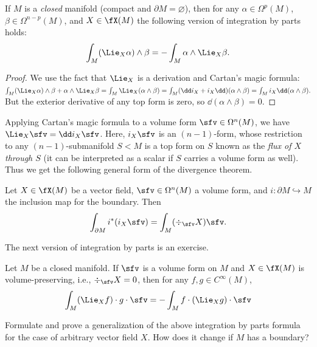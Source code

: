 \begin{cor}
    If $M$ is a \emph{closed} manifold (compact and $\partial M=\varnothing$), then for any $\alpha\in\Omega^p(M)$, $\beta\in\Omega^{n-p}(M)$, and $X\in\fX(M)$ the following version of integration by parts holds:
    \[\int_M (\Lie_X \alpha)\wedge\beta=-\int_M \alpha\wedge\Lie_X\beta.\]
\end{cor}
\begin{proof}
    We use the fact that $\Lie_X$ is a derivation and Cartan's magic formula:
    $\int_M (\Lie_X\alpha)\wedge\beta+\alpha\wedge\Lie_X\beta=\int_M \Lie_X (\alpha\wedge\beta)=\int_M (\dd i_X+i_X\dd)(\alpha\wedge\beta)=\int_M i_X \dd(\alpha\wedge\beta).$
    But the exterior derivative of any top form is zero, so $\dd(\alpha\wedge\beta)=0$.
\end{proof}
Applying Cartan's magic formula to a volume form $\sfv\in\Omega^n(M)$, we have $\Lie_X\sfv=\dd i_X\sfv$. Here, $i_X\sfv$ is an $(n-1)$-form, whose restriction to any $(n-1)$-submanifold $S<M$ is a top form on $S$ known as the \emph{flux of $X$ through $S$} (it can be interpreted as a scalar if $S$ carries a volume form as well). Thus we get the following general form of the divergence theorem.
\begin{cor}
    Let $X\in\fX(M)$ be a vector field, $\sfv\in\Omega^n(M)$ a volume form, and $i:\partial M\hookrightarrow M$ the inclusion map for the boundary. Then 
    \[\int_{\partial M}i^\ast(i_X\sfv)=\int_M (\div_{\sfv}X)\sfv.\]
\end{cor}
The next version of integration by parts is an exercise.
\begin{cor}
    Let $M$ be a closed manifold. If $\sfv$ is a volume form on $M$ and $X\in\fX(M)$ is volume-preserving, i.e., $\div_\sfv X=0$, then for any $f,g\in C^\infty(M)$,
    \[\int_M (\Lie_Xf)\cdot g\cdot \sfv=-\int_M f\cdot (\Lie_Xg)\cdot \sfv\]
\end{cor}
\begin{xca}
    Formulate and prove a generalization of the above  integration by parts formula for the case of arbitrary vector field $X$. How does it change if $M$ has a boundary?
\end{xca}


